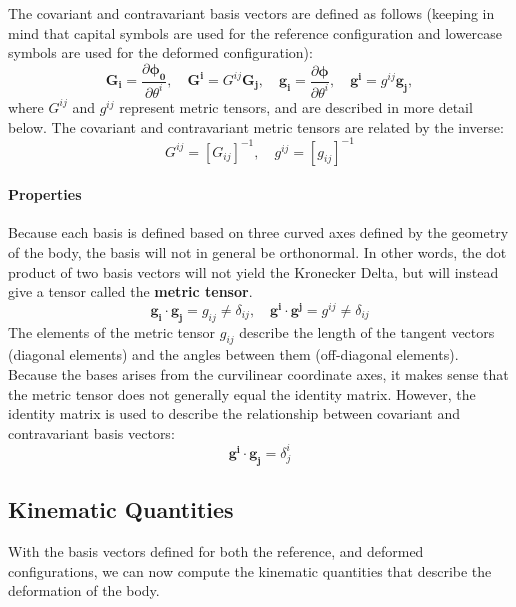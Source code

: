 \documentclass[]{spie}  %
\begin{document}
The covariant and contravariant basis vectors are defined as follows (keeping in mind that capital symbols are used for the reference configuration and lowercase symbols are used for the deformed configuration):
\begin{equation}
\bm{G_i} = \frac{\partial \bm{\phi_0}}{\partial \theta^i}, \quad \bm{G^i} = G^{ij}\bm{G_j}, \quad \bm{g_i} = \frac{\partial \bm{\phi}}{\partial \theta^i}, \quad \bm{g^i} = g^{ij}\bm{g_j},
\end{equation}
where $G^{ij}$ and $g^{ij}$ represent metric tensors, and are described in more detail below. The covariant and contravariant metric tensors are related by the inverse:
\begin{equation}
G^{ij} = [G_{ij}]^{-1}, \quad g^{ij} = [g_{ij}]^{-1}
\end{equation}

\paragraph{Properties}
Because each basis is defined based on three curved axes defined by the geometry of the body, the basis will not in general be orthonormal. In other words, the dot product of two basis vectors will not yield the Kronecker Delta, but will instead give a tensor called the \textbf{metric tensor}.
\begin{equation}
\bm{g_i} \cdot \bm{g_j} = g_{ij} \neq \delta_{ij}, \quad \bm{g^i} \cdot \bm{g^j} = g^{ij} \neq \delta_{ij}
\end{equation}
The elements of the metric tensor $g_{ij}$ describe the length of the tangent vectors (diagonal elements) and the angles between them (off-diagonal elements). Because the bases arises from the curvilinear coordinate axes, it makes sense that the metric tensor does not generally equal the identity matrix. However, the identity matrix is used to describe the relationship between covariant and contravariant basis vectors:
\begin{equation}
\bm{g^i} \cdot \bm{g_j} = \delta^i_j
\end{equation}


\subsection{Kinematic Quantities}
With the basis vectors defined for both the reference, and deformed configurations, we can now compute the kinematic quantities that describe the deformation of the body. 
\end{document}
